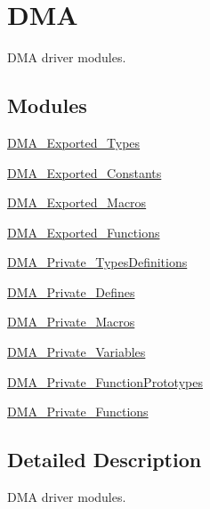\hypertarget{group___d_m_a}{}\section{D\+MA}
\label{group___d_m_a}


D\+MA driver modules.  


\subsection*{Modules}
\begin{DoxyCompactItemize}
\item 
\mbox{\hyperlink{group___d_m_a___exported___types}{D\+M\+A\+\_\+\+Exported\+\_\+\+Types}}
\item 
\mbox{\hyperlink{group___d_m_a___exported___constants}{D\+M\+A\+\_\+\+Exported\+\_\+\+Constants}}
\item 
\mbox{\hyperlink{group___d_m_a___exported___macros}{D\+M\+A\+\_\+\+Exported\+\_\+\+Macros}}
\item 
\mbox{\hyperlink{group___d_m_a___exported___functions}{D\+M\+A\+\_\+\+Exported\+\_\+\+Functions}}
\item 
\mbox{\hyperlink{group___d_m_a___private___types_definitions}{D\+M\+A\+\_\+\+Private\+\_\+\+Types\+Definitions}}
\item 
\mbox{\hyperlink{group___d_m_a___private___defines}{D\+M\+A\+\_\+\+Private\+\_\+\+Defines}}
\item 
\mbox{\hyperlink{group___d_m_a___private___macros}{D\+M\+A\+\_\+\+Private\+\_\+\+Macros}}
\item 
\mbox{\hyperlink{group___d_m_a___private___variables}{D\+M\+A\+\_\+\+Private\+\_\+\+Variables}}
\item 
\mbox{\hyperlink{group___d_m_a___private___function_prototypes}{D\+M\+A\+\_\+\+Private\+\_\+\+Function\+Prototypes}}
\item 
\mbox{\hyperlink{group___d_m_a___private___functions}{D\+M\+A\+\_\+\+Private\+\_\+\+Functions}}
\end{DoxyCompactItemize}


\subsection{Detailed Description}
D\+MA driver modules. 

